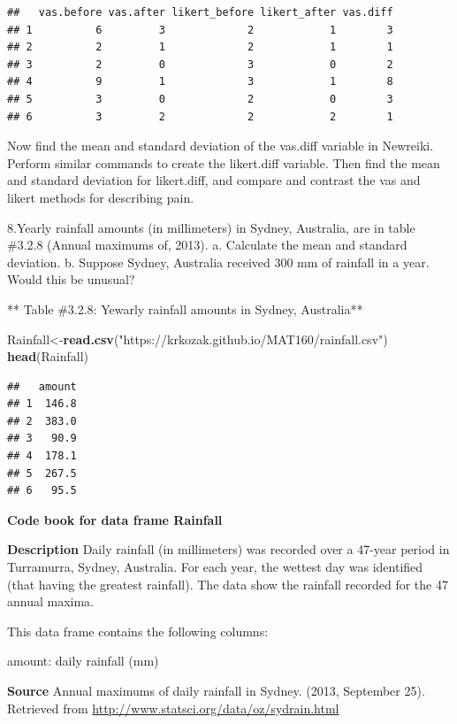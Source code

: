 \documentclass[
]{book}
\newenvironment{Shaded}{\begin{snugshade}}{\end{snugshade}}
\newcommand{\KeywordTok}[1]{\textcolor[rgb]{0.13,0.29,0.53}{\textbf{#1}}}
\newcommand{\NormalTok}[1]{#1}
\newcommand{\StringTok}[1]{\textcolor[rgb]{0.31,0.60,0.02}{#1}}
\begin{document}
\begin{verbatim}
##   vas.before vas.after likert_before likert_after vas.diff
## 1          6         3             2            1        3
## 2          2         1             2            1        1
## 3          2         0             3            0        2
## 4          9         1             3            1        8
## 5          3         0             2            0        3
## 6          3         2             2            2        1
\end{verbatim}

Now find the mean and standard deviation of the vas.diff variable in Newreiki. Perform similar commands to create the likert.diff variable. Then find the mean and standard deviation for likert.diff, and compare and contrast the vas and likert methods for describing pain.

8.Yearly rainfall amounts (in millimeters) in Sydney, Australia, are in table \#3.2.8
(Annual maximums of, 2013).
a. Calculate the mean and standard deviation.
b. Suppose Sydney, Australia received 300 mm of rainfall in a year. Would this be unusual?

** Table \#3.2.8: Yewarly rainfall amounts in Sydney, Australia**

\begin{Shaded}
\begin{Highlighting}[]
\NormalTok{Rainfall<-}\KeywordTok{read.csv}\NormalTok{(}\StringTok{"https://krkozak.github.io/MAT160/rainfall.csv"}\NormalTok{)}
\KeywordTok{head}\NormalTok{(Rainfall)}
\end{Highlighting}
\end{Shaded}

\begin{verbatim}
##   amount
## 1  146.8
## 2  383.0
## 3   90.9
## 4  178.1
## 5  267.5
## 6   95.5
\end{verbatim}

\textbf{Code book for data frame Rainfall}

\textbf{Description}
Daily rainfall (in millimeters) was recorded over a 47-year period in Turramurra, Sydney, Australia. For each year, the wettest day was identified (that having the greatest rainfall). The data show the rainfall recorded for the 47 annual maxima.

This data frame contains the following columns:

amount: daily rainfall (mm)

\textbf{Source}
Annual maximums of daily rainfall in Sydney. (2013, September 25). Retrieved from
\url{http://www.statsci.org/data/oz/sydrain.html}
\end{document}

